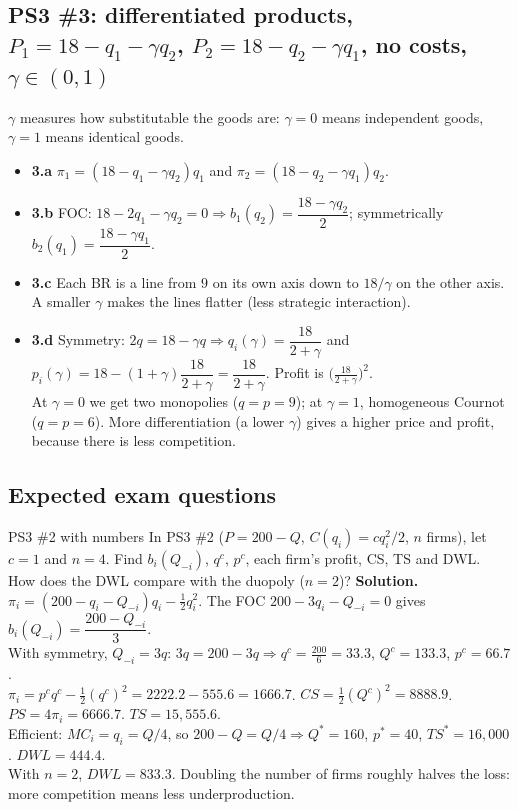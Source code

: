 \documentclass[11pt]{article}
\newcommand{\soln}{\tcblower\textbf{Solution.}\ }
\begin{document}
\subsection*{PS3 \#3: differentiated products, $P_1=18-q_1-\gamma q_2$, $P_2=18-q_2-\gamma q_1$, no costs, $\gamma\in(0,1)$}
$\gamma$ measures how substitutable the goods are: $\gamma=0$ means independent goods, $\gamma=1$ means identical goods.
\begin{itemize}
\item \textbf{3.a} $\pi_1=(18-q_1-\gamma q_2)q_1$ and $\pi_2=(18-q_2-\gamma q_1)q_2$.
\item \textbf{3.b} FOC: $18-2q_1-\gamma q_2=0\Rightarrow b_1(q_2)=\dfrac{18-\gamma q_2}{2}$; symmetrically $b_2(q_1)=\dfrac{18-\gamma q_1}{2}$.
\item \textbf{3.c} Each BR is a line from $9$ on its own axis down to $18/\gamma$ on the other axis. A smaller $\gamma$ makes the lines flatter (less strategic interaction).
\item \textbf{3.d} Symmetry: $2q=18-\gamma q\Rightarrow\boxed{q_i(\gamma)=\dfrac{18}{2+\gamma}}$ and $p_i(\gamma)=18-(1+\gamma)\dfrac{18}{2+\gamma}=\boxed{\dfrac{18}{2+\gamma}}$. Profit is $\big(\tfrac{18}{2+\gamma}\big)^2$.\\
At $\gamma=0$ we get two monopolies ($q=p=9$); at $\gamma=1$, homogeneous Cournot ($q=p=6$). More differentiation (a lower $\gamma$) gives a higher price and profit, because there is less competition.
\end{itemize}


\subsection*{Expected exam questions}
\begin{examq}{PS3 \#2 with numbers}
In PS3 \#2 ($P=200-Q$, $C(q_i)=cq_i^2/2$, $n$ firms), let $c=1$ and $n=4$. Find $b_i(Q_{-i})$, $q^c$, $p^c$, each firm's profit, CS, TS and DWL. How does the DWL compare with the duopoly ($n=2$)?
\soln
$\pi_i=(200-q_i-Q_{-i})q_i-\tfrac12q_i^2$. The FOC $200-3q_i-Q_{-i}=0$ gives $b_i(Q_{-i})=\dfrac{200-Q_{-i}}{3}$.\\
With symmetry, $Q_{-i}=3q$: $3q=200-3q\Rightarrow q^c=\tfrac{200}{6}=33.3$, $Q^c=133.3$, $p^c=66.7$.\\
$\pi_i=p^cq^c-\tfrac12(q^c)^2=2222.2-555.6=1666.7$. $CS=\tfrac12(Q^c)^2=8888.9$. $PS=4\pi_i=6666.7$. $TS=15{,}555.6$.\\
Efficient: $MC_i=q_i=Q/4$, so $200-Q=Q/4\Rightarrow Q^*=160$, $p^*=40$, $TS^*=16{,}000$. $DWL=444.4$.\\
With $n=2$, $DWL=833.3$. Doubling the number of firms roughly halves the loss: more competition means less underproduction.
\end{examq}
\end{document}
